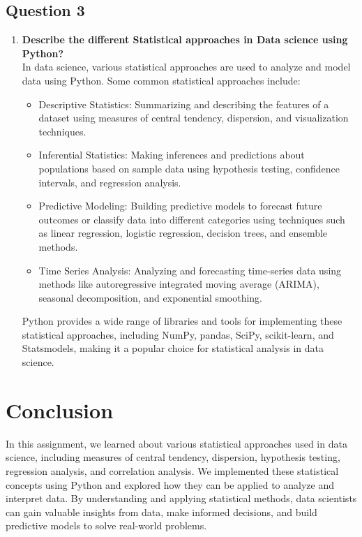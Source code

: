 \documentclass[11pt]{article}
\begin{document}
\subsection{Question 3}
\begin{enumerate}
    \item \textbf{Describe the different Statistical approaches in Data science using Python?}\\
          In data science, various statistical approaches are used to analyze and model data using Python. Some common statistical approaches include:
          \begin{itemize}
              \item Descriptive Statistics: Summarizing and describing the features of a dataset using measures of central tendency, dispersion, and visualization techniques.
              \item Inferential Statistics: Making inferences and predictions about populations based on sample data using hypothesis testing, confidence intervals, and regression analysis.
              \item Predictive Modeling: Building predictive models to forecast future outcomes or classify data into different categories using techniques such as linear regression, logistic regression, decision trees, and ensemble methods.
              \item Time Series Analysis: Analyzing and forecasting time-series data using methods like autoregressive integrated moving average (ARIMA), seasonal decomposition, and exponential smoothing.
          \end{itemize}
          Python provides a wide range of libraries and tools for implementing these statistical approaches, including NumPy, pandas, SciPy, scikit-learn, and Statsmodels, making it a popular choice for statistical analysis in data science.
\end{enumerate}

\section{Conclusion}
In this assignment, we learned about various statistical approaches used in data science, including measures of central tendency, dispersion, hypothesis testing, regression analysis, and correlation analysis. We implemented these statistical concepts using Python and explored how they can be applied to analyze and interpret data. By understanding and applying statistical methods, data scientists can gain valuable insights from data, make informed decisions, and build predictive models to solve real-world problems.
\clearpage

\pagebreak



\end{document}
